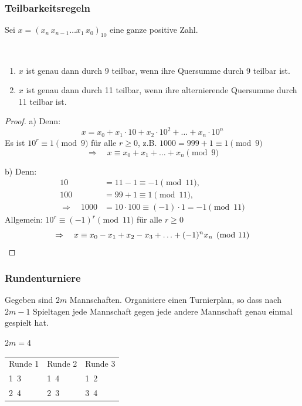 \subsubsection*{Teilbarkeitsregeln}

Sei $x = (x_n\, x_{n-1} \ldots x_1\, x_0)_{10}$ eine ganze positive Zahl.

\begin{satz}[Teilbarkeitsregeln]\
\begin{enumerate}[label=\alph*)]
\item $x$ ist genau dann durch 9 teilbar, wenn ihre Quersumme durch 9 teilbar ist.
\item $x$ ist genau dann durch 11 teilbar, wenn ihre alternierende Quersumme durch 11 teilbar ist.
\end{enumerate}
\end{satz}

\begin{proof}
a) Denn:
\[ x = x_0 + x_1 \cdot 10 + x_2 \cdot 10^2 + \ldots + x_n \cdot 10^n \]
Es ist $10^r \equiv 1 \pmod{9}$ für alle $r \geq 0$, z.B. $1000 = 999 + 1 \equiv 1 \pmod{9}$
\[ \Rightarrow \quad x \equiv x_0 + x_1 + \ldots + x_n \pmod{9} \]

b) Denn:
\begin{align*}
10 &= 11 - 1 \equiv -1 \pmod{11}, \\
100 &= 99 + 1 \equiv 1 \pmod{11}, \\
\Rightarrow \quad 1000 &= 10 \cdot 100 \equiv (-1) \cdot 1 = -1 \pmod{11}
\end{align*}
Allgemein: $10^r \equiv (-1)^r \pmod{11}$ für alle $r \geq 0$
\[ \Rightarrow \quad x \equiv x_0 - x_1 + x_2 - x_3 + \ldots + (-1)^n x_n \pmod{11} \qedhere \]
\end{proof}

\subsubsection*{Rundenturniere}

Gegeben sind $2m$ Mannschaften. Organisiere einen Turnierplan, so dass nach $2m - 1$ Spieltagen jede Mannschaft gegen jede andere Mannschaft genau einmal gespielt hat.

\begin{beispiel}
$2m = 4$
\begin{center}
\begin{tabular}{lll}
Runde 1 & Runde 2 & Runde 3 \\
1\ 3 & 1\ 4 & 1\ 2 \\
2\ 4 & 2\ 3 & 3\ 4
\end{tabular}
\end{center}
\end{beispiel}


